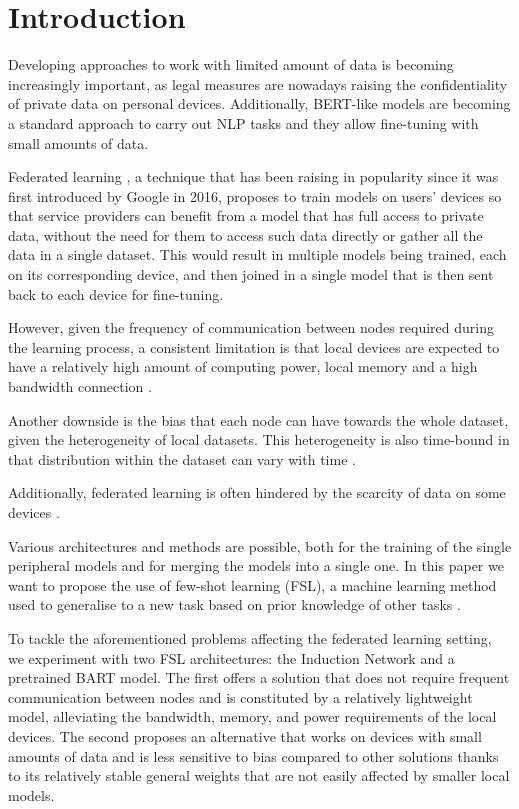 \documentclass{esannV2}
\begin{document}


\section{Introduction}
Developing approaches to work with limited amount of data is becoming increasingly important, as legal measures are nowadays raising the confidentiality of private data on personal devices. Additionally, BERT-like models are becoming a standard approach to carry out NLP tasks and they allow fine-tuning with small amounts of data.

Federated learning \cite{fedavg}, a technique that has been raising in popularity since it was first introduced by Google in 2016, proposes to train models on users' devices so that service providers can benefit from a model that has full access to private data, without the need for them to access such data directly or gather all the data in a single dataset. This would result in multiple models being trained, each on its corresponding device, and then joined in a single model that is then sent back to each device for fine-tuning.

However, given the frequency of communication between nodes required during the learning process, a consistent limitation is that local devices are expected to have a relatively high amount of computing power, local memory and a high bandwidth connection \cite{problems}.

Another downside is the bias that each node can have towards the whole dataset, given the heterogeneity of local datasets. This heterogeneity is also time-bound in that distribution within the dataset can vary with time \cite{problems}.

Additionally, federated learning is often hindered by the scarcity of data on some devices \cite{problems}.

Various architectures and methods are possible, both for the training of the single peripheral models and for merging the models into a single one. In this paper we want to propose the use of few-shot learning (FSL), a machine learning method used to generalise to a new task based on prior knowledge of other tasks \cite{wang2020generalizing}.

To tackle the aforementioned problems affecting the federated learning setting, we experiment with two FSL architectures: the Induction Network and a pretrained BART model. The first offers a solution that does not require frequent communication between nodes and is constituted by a relatively lightweight model, alleviating the bandwidth, memory, and power requirements of the local devices. The second proposes an alternative that works on devices with small amounts of data and is less sensitive to bias compared to other solutions thanks to its relatively stable general weights that are not easily affected by smaller local models. 
\end{document}
